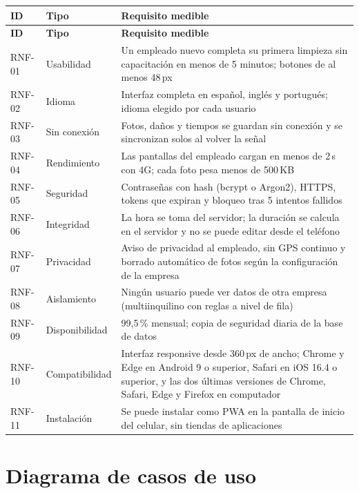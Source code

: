 \documentclass[11pt,a4paper]{article}
\begin{document}
{\small
\begin{longtable}{L{1.5cm} L{2.4cm} L{10.6cm}}
\toprule
\textbf{ID} & \textbf{Tipo} & \textbf{Requisito medible}\\
\midrule
\endfirsthead
\toprule
\textbf{ID} & \textbf{Tipo} & \textbf{Requisito medible}\\
\midrule
\endhead
\bottomrule
\endfoot
RNF-01 & Usabilidad & Un empleado nuevo completa su primera limpieza sin capacitación en menos de 5 minutos; botones de al menos 48\,px\\
RNF-02 & Idioma & Interfaz completa en español, inglés y portugués; idioma elegido por cada usuario\\
RNF-03 & Sin conexión & Fotos, daños y tiempos se guardan sin conexión y se sincronizan solos al volver la señal\\
RNF-04 & Rendimiento & Las pantallas del empleado cargan en menos de 2\,s con 4G; cada foto pesa menos de 500\,KB\\
RNF-05 & Seguridad & Contraseñas con hash (bcrypt o Argon2), HTTPS, tokens que expiran y bloqueo tras 5 intentos fallidos\\
RNF-06 & Integridad & La hora se toma del servidor; la duración se calcula en el servidor y no se puede editar desde el teléfono\\
RNF-07 & Privacidad & Aviso de privacidad al empleado, sin GPS continuo y borrado automático de fotos según la configuración de la empresa\\
RNF-08 & Aislamiento & Ningún usuario puede ver datos de otra empresa (multiinquilino con reglas a nivel de fila)\\
RNF-09 & Disponibilidad & 99,5\,\% mensual; copia de seguridad diaria de la base de datos\\
RNF-10 & Compatibilidad & Interfaz responsive desde 360\,px de ancho; Chrome y Edge en Android 9 o superior, Safari en iOS 16.4 o superior, y las dos últimas versiones de Chrome, Safari, Edge y Firefox en computador\\
RNF-11 & Instalación & Se puede instalar como PWA en la pantalla de inicio del celular, sin tiendas de aplicaciones\\
\end{longtable}
}

\section{Diagrama de casos de uso}
\end{document}
